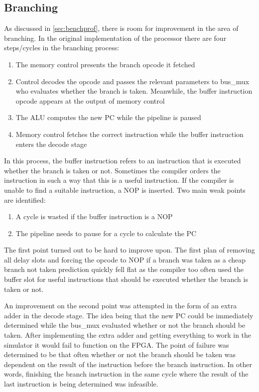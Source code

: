\documentclass[final]{article}
\begin{document}
\subsection{Branching}
As discussed in \cref{sec:benchprof}, there is room for improvement in the area of branching. In the original implementation of the processor there are four steps/cycles in the branching process:
\begin{enumerate}
\item The memory control presents the branch opcode it fetched
\item Control decodes the opcode and passes the relevant parameters to bus\_mux who evaluates whether the branch is taken. Meanwhile, the buffer instruction opcode appears at the output of memory control
\item The ALU computes the new PC while the pipeline is paused
\item Memory control fetches the correct instruction while the buffer instruction enters the decode stage
\end{enumerate}
In this process, the buffer instruction refers to an instruction that is executed whether the branch is taken or not. Sometimes the compiler orders the instruction in such a way that this is a useful instruction. If the compiler is unable to find a suitable instruction, a NOP is inserted. Two main weak points are identified:
\begin{enumerate}
\item A cycle is wasted if the buffer instruction is a NOP
\item The pipeline needs to pause for a cycle to calculate the PC
\end{enumerate}
The first point turned out to be hard to improve upon. The first plan of removing all delay slots and forcing the opcode to NOP if a branch was taken as a cheap branch not taken prediction quickly fell flat as the compiler too often used the buffer slot for useful instructions that should be executed whether the branch is taken or not.

An improvement on the second point was attempted in the form of an extra adder in the decode stage. The idea being that the new PC could be immediately determined while the bus\_mux evaluated whether or not the branch should be taken. After implementing the extra adder and getting everything to work in the simulator it would fail to function on the FPGA. The point of failure was determined to be that often whether or not the branch should be taken was dependent on the result of the instruction before the branch instruction. In other words, finishing the branch instruction in the same cycle where the result of the last instruction is being determined was infeasible. 
\end{document}
